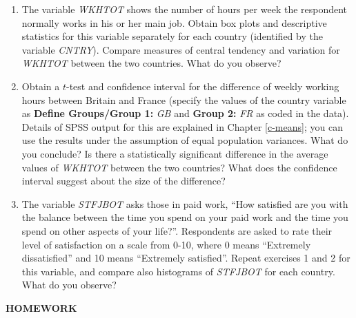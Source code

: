 \documentclass[11pt,a4paper,openany]{book}
\begin{document}
\begin{enumerate}
\def\labelenumi{\arabic{enumi}.}
\item
  The variable \emph{WKHTOT} shows the number of hours per week the
  respondent normally works in his or her main job. Obtain box plots and
  descriptive statistics for this variable separately for each country
  (identified by the variable \emph{CNTRY}). Compare measures of central
  tendency and variation for \emph{WKHTOT} between the two countries.
  What do you observe?
\item
  Obtain a \(t\)-test and confidence interval for the difference of
  weekly working hours between Britain and France (specify the values of
  the country variable as \textbf{Define Groups/Group 1:} \emph{GB} and
  \textbf{Group 2:} \emph{FR} as coded in the data). Details of SPSS
  output for this are explained in Chapter \ref{c-means}; you can use
  the results under the assumption of equal population variances. What
  do you conclude? Is there a statistically significant difference in
  the average values of \emph{WKHTOT} between the two countries? What
  does the confidence interval suggest about the size of the difference?
\item
  The variable \emph{STFJBOT} asks those in paid work, ``How satisfied
  are you with the balance between the time you spend on your paid work
  and the time you spend on other aspects of your life?''. Respondents
  are asked to rate their level of satisfaction on a scale from 0-10,
  where 0 means ``Extremely dissatisfied'' and 10 means ``Extremely
  satisfied''. Repeat exercises 1 and 2 for this variable, and compare
  also histograms of \emph{STFJBOT} for each country. What do you
  observe?
\end{enumerate}

\textbf{HOMEWORK}
\end{document}
